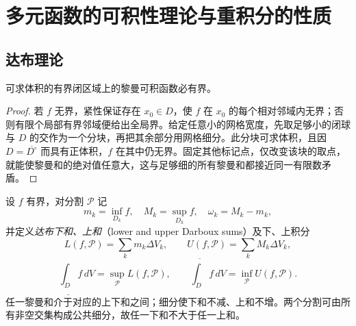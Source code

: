 \documentclass[UTF8,12pt,a4paper,fontset=fandol]{ctexbook}
\begin{document}
\section{多元函数的可积性理论与重积分的性质}
\label{sec:multivariable-integrability-and-multiple-integral-properties}

\subsection{达布理论}
\label{subsec:multivariable-darboux-theory}

\begin{theorem}
\label{thm:multiple-integrable-bounded}
可求体积的有界闭区域上的黎曼可积函数必有界。
\end{theorem}
\begin{proof}
若 $f$ 无界，紧性保证存在 $x_0\in D$，使 $f$ 在 $x_0$ 的每个相对邻域内无界；否则有限个局部有界邻域便给出全局界。给定任意小的网格宽度，先取足够小的闭球与 $D$ 的交作为一个分块，再把其余部分用网格细分。此分块可求体积，且因 $D=\overline{D^\circ}$ 而具有正体积，$f$ 在其中仍无界。固定其他标记点，仅改变该块的取点，就能使黎曼和的绝对值任意大，这与足够细的所有黎曼和都接近同一有限数矛盾。
\end{proof}

设 $f$ 有界，对分割 $\mathcal P$ 记
\[
    m_k=\inf_{D_k}f,\quad M_k=\sup_{D_k}f,\quad
    \omega_k=M_k-m_k,
\]
并定义\emph{达布下和、上和}（lower and upper Darboux sums）及下、上积分
\[
    L(f,\mathcal P)=\sum_km_k\Delta V_k,\qquad
    U(f,\mathcal P)=\sum_kM_k\Delta V_k,
\]
\[
    \underline{\int_D}f\,dV=\sup_{\mathcal P}L(f,\mathcal P),\qquad
    \overline{\int_D}f\,dV=\inf_{\mathcal P}U(f,\mathcal P).
\]
任一黎曼和介于对应的上下和之间；细分使下和不减、上和不增。两个分割可由所有非空交集构成公共细分，故任一下和不大于任一上和。
\end{document}
